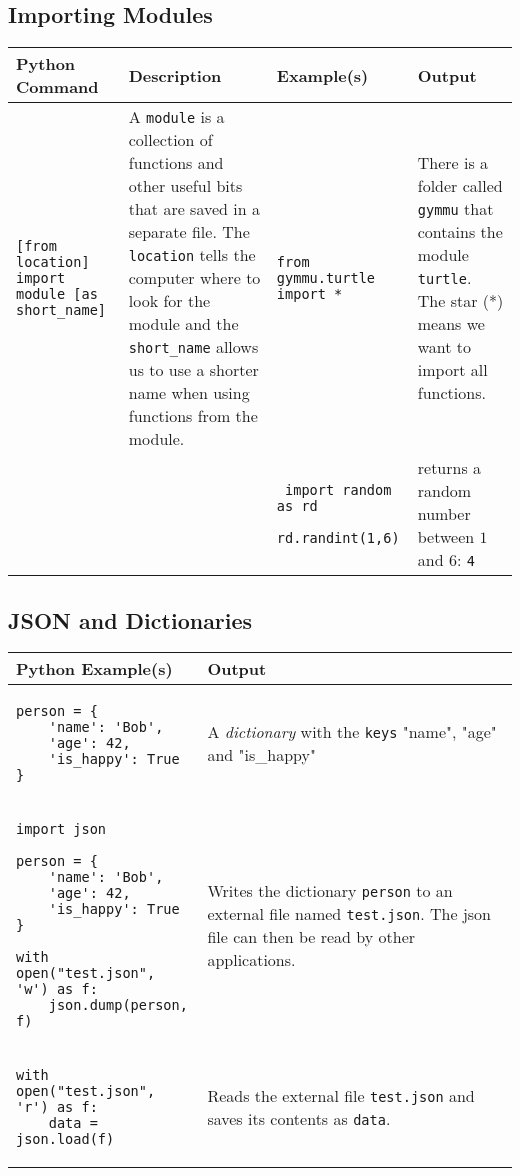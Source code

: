 \documentclass[11pt,a4paper]{report}
\begin{document}
\subsection{Importing Modules}

\begin{longtable}{|p{}|p{}|p{}|p{}|}
\hline
Python Command & Description & Example(s) & Output  \\
\hline 
\endhead
\lstinline|[from location] import module [as short_name]| & A \verb|module| is a collection of functions and other useful bits that are saved in a separate file. The \verb|location| tells the computer where to look for the module and the \verb|short_name| allows us to use a shorter name when using functions from the module. & \lstinline|from gymmu.turtle import *| & There is a folder called \verb|gymmu| that contains the module \verb|turtle|. The star (*) means we want to import all functions. \\
\hline
 && \begin{lstlisting}
 import random as rd
 rd.randint(1,6)
 \end{lstlisting}
 & returns a random number between $1$ and $6$: \newline
 \verb|4| \\
 \hline
\end{longtable}

\newpage
\subsection{JSON and Dictionaries}

\begin{longtable}{|p{}|p{}|}
\hline
Python  Example(s) & Output  \\
\hline 
\endhead 
 \begin{lstlisting}
person = {
    'name': 'Bob',
    'age': 42,
    'is_happy': True
}
\end{lstlisting}  &  A \emph{dictionary} with the \verb|keys| "name", "age" and "is\_happy" \\
\hline
\begin{lstlisting}
import json

person = {
    'name': 'Bob',
    'age': 42,
    'is_happy': True
}

with open("test.json", 'w') as f:
    json.dump(person, f)
\end{lstlisting} & Writes the dictionary \verb|person| to an external file named \verb|test.json|. The json file can then be read by other applications. \\
\hline

\begin{lstlisting}
with open("test.json", 'r') as f:
    data = json.load(f)
\end{lstlisting} & Reads the external file \verb|test.json| and saves its contents as \verb|data|. \\
\hline


\end{longtable}
\end{document}
